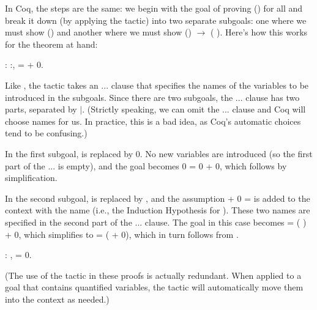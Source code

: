 \documentclass[12pt]{report}
\begin{document}
    In Coq, the steps are the same: we begin with the goal of proving
    () for all  and break it down (by applying the 
    tactic) into two separate subgoals: one where we must show ()
    and another where we must show () \ensuremath{\rightarrow} ( ).  Here's how
    this works for the theorem at hand: \begin{coqdoccode}
\coqdocemptyline
\coqdocnoindent
{}  : \coqdockw{\ensuremath{\forall}} :,  =  + 0.\coqdoceol
\coqdocemptyline
\end{coqdoccode}
Like , the  tactic takes an ...
    clause that specifies the names of the variables to be introduced
    in the subgoals.  Since there are two subgoals, the ... clause
    has two parts, separated by \ensuremath{|}.  (Strictly speaking, we can omit
    the ... clause and Coq will choose names for us.  In practice,
    this is a bad idea, as Coq's automatic choices tend to be
    confusing.)


    In the first subgoal,  is replaced by 0.  No new variables
    are introduced (so the first part of the ... is empty), and
    the goal becomes 0 = 0 + 0, which follows by simplification.


    In the second subgoal,  is replaced by  , and the
    assumption  + 0 =  is added to the context with the name
     (i.e., the Induction Hypothesis for ).  These two names
    are specified in the second part of the ... clause.  The goal
    in this case becomes   = ( ) + 0, which simplifies to
      =  ( + 0), which in turn follows from . \begin{coqdoccode}
\coqdocemptyline
\coqdocnoindent
{}  : \coqdockw{\ensuremath{\forall}} ,\coqdoceol
\coqdocindent{1.00em}
   = 0.\coqdoceol
\coqdocemptyline
\end{coqdoccode}
(The use of the  tactic in these proofs is actually
    redundant.  When applied to a goal that contains quantified
    variables, the  tactic will automatically move them
    into the context as needed.) 
\end{document}
